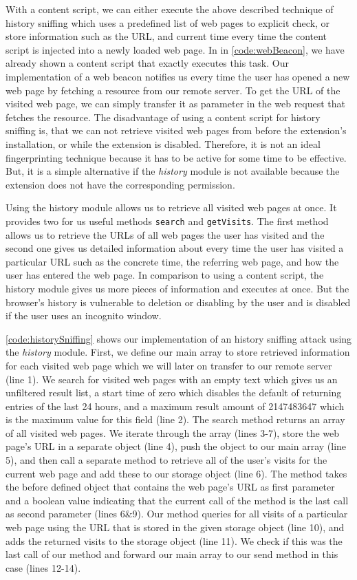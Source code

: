 	With a content script, we can either execute the above described technique of history sniffing which uses a predefined list of web pages to explicit check, or store information such as the URL, and current time every time the content script is injected into a newly loaded web page. In in \autoref{code:webBeacon}, we have already shown a content script that exactly executes this task. Our implementation of a web beacon notifies us every time the user has opened a new web page by fetching a resource from our remote server. To get the URL of the visited web page, we can simply transfer it as parameter in the web request that fetches the resource. The disadvantage of using a content script for history sniffing is, that we can not retrieve visited web pages from before the extension's installation, or while the extension is disabled. Therefore, it is not an ideal fingerprinting technique because it has to be active for some time to be effective. But, it is a simple alternative if the \textit{history} module is not available because the extension does not have the corresponding permission.
	
	Using the history module allows us to retrieve all visited web pages at once. It provides two for us useful methods \texttt{search} and \texttt{getVisits}. The first method allows us to retrieve the URLs of all web pages the user has visited and the second one gives us detailed information about every time the user has visited a particular URL such as the concrete time, the referring web page, and how the user has entered the web page. In comparison to using a content script, the history module gives us more pieces of information and executes at once. But the browser's history is vulnerable to deletion or disabling by the user and is disabled if the user uses an incognito window.
	
	\autoref{code:historySniffing} shows our implementation of an history sniffing attack using the \textit{history} module. First, we define our main array to store retrieved information for each visited web page which we will later on transfer to our remote server (line 1). We search for visited web pages with an empty text which gives us an unfiltered result list, a start time of zero which disables the default of returning entries of the last 24 hours, and a maximum result amount of 2147483647 which is the maximum value for this field (line 2). The search method returns an array of all visited web pages. We iterate through the array (lines 3-7), store the web page's URL in a separate object (line 4), push the object to our main array (line 5), and then call a separate method to retrieve all of the user's visits for the current web page and add these to our storage object (line 6). The method takes the before defined object that contains the web page's URL as first parameter and a boolean value indicating that the current call of the method is the last call as second parameter (lines 6\&9). Our method queries for all visits of a particular web page using the URL that is stored in the given storage object (line 10), and adds the returned visits to the storage object (line 11). We check if this was the last call of our method and forward our main array to our send method in this case (lines 12-14).
 
